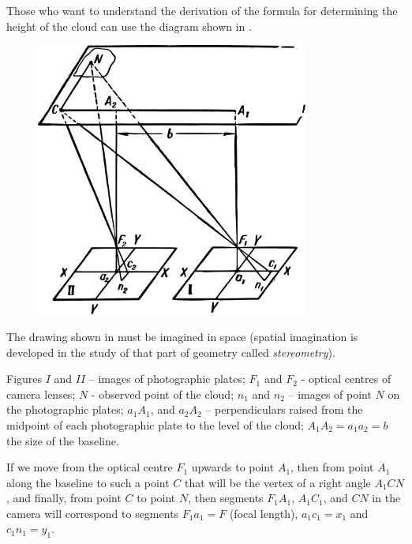 Those who want to understand the derivation of the formula for determining the height of the cloud can use the diagram shown in .

\begin{figure}[h!]
\centering
\includegraphics[width=0.8\textwidth]{figures/ch-03/fig-077.pdf}
\end{figure}

The drawing shown in  must be imagined in space (spatial imagination is developed in the study of that part of geometry called \emph{stereometry}).


Figures $I$ and $II$ -- images of photographic plates; $F_{1}$ and $F_{2}$ - optical centres of camera lenses; $N$ - observed point of the cloud; $n_{1}$ and $n_{2}$ -- images of point $N$ on the photographic plates; $a_{1}A_{1}$, and $a_{2}A_{2}$ -- perpendiculars raised from the midpoint of each photographic plate to the level of the cloud; $A_{1}A_{2} = a_{1}a_{2} = b$ the size of the baseline.

If we move from the optical centre $F_{1}$ upwards to point $A_{1}$, then from point $A_{1}$ along the baseline to such a point $C$ that will be the vertex of a right angle $A_{1}CN$, and finally, from point $C$ to point $N$, then segments $F_{1}A_{1}$, $A_{1}C_{1}$, and $CN$ in the camera will correspond to segments $F_{1}a_{1} = F$ (focal length), $a_{1}c_{1} = x_{1}$ and $c_{1}n_{1} = y_{1}$.

